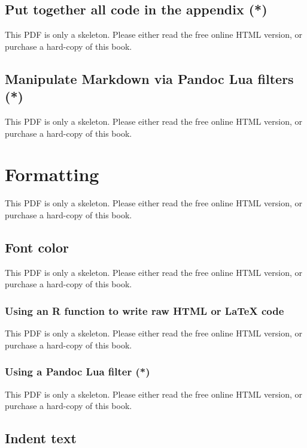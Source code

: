 \documentclass[
  11pt,
]{krantz}
\begin{document}
\section{Put together all code in the appendix (*)}\label{code-appendix}

This PDF is only a skeleton. Please either read the free online HTML version, or purchase a hard-copy of this book.

\section{Manipulate Markdown via Pandoc Lua filters (*)}\label{lua-filters}

This PDF is only a skeleton. Please either read the free online HTML version, or purchase a hard-copy of this book.

\chapter{Formatting}\label{formatting}

This PDF is only a skeleton. Please either read the free online HTML version, or purchase a hard-copy of this book.

\section{Font color}\label{font-color}

This PDF is only a skeleton. Please either read the free online HTML version, or purchase a hard-copy of this book.

\subsection{Using an R function to write raw HTML or LaTeX code}\label{using-an-r-function-to-write-raw-html-or-latex-code}

This PDF is only a skeleton. Please either read the free online HTML version, or purchase a hard-copy of this book.

\subsection{Using a Pandoc Lua filter (*)}\label{lua-color}

This PDF is only a skeleton. Please either read the free online HTML version, or purchase a hard-copy of this book.

\section{Indent text}\label{indent-text}
\end{document}
